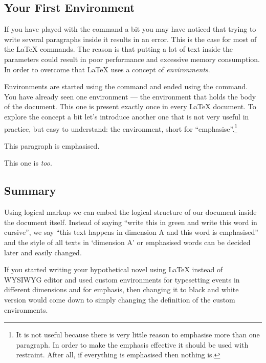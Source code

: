 \subsection{Your First Environment}

If you have played with the  command a bit you may have noticed that
trying to write several paragraphs inside it results in an error. This is the
case for most of the \LaTeX{} commands. The reason is that putting a lot of
text inside the parameters could result in poor performance and excessive
memory consumption. In order to overcome that \LaTeX{} uses a concept of
\emph{environments}.

Environments are started using the  command and ended using the
 command. You have already seen one environment --- the
 environment that holds the body of the document. This one is
present exactly once in every \LaTeX{} document. To explore the concept a bit
let's introduce another one that is not very useful in practice, but easy to
understand: the  environment, short for
\enquote{emphasise}.\footnote{It is not useful because there is very little
  reason to emphasise more than one paragraph. In order to make the emphasis
  effective it should be used with restraint. After all, if everything is
  emphasised then nothing is.}
\begin{example}
\begin{em}
  This paragraph is emphasised.

  This one is \emph{too}.
\end{em}
\end{example}

\subsection{Summary}

Using logical markup we can embed the logical structure of our document inside
the document itself. Instead of saying \enquote{write this in green and write
  this word in cursive}, we say \enquote{this text happens in dimension A and
  this word is emphasised} and the style of all texts in \enquote*{dimension A}
or emphasised words can be decided later and easily changed.

If you started writing your hypothetical novel using \LaTeX{} instead of
WYSIWYG editor and used custom environments for typesetting events in different
dimensions and  for emphasis, then changing it to black and white
version would come down to simply changing the definition of the custom
environments.

